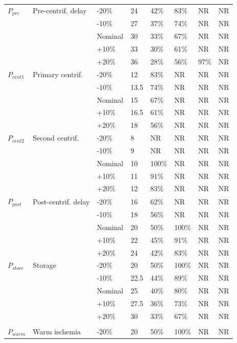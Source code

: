\documentclass[preprint,12pt]{elsarticle}
\begin{document}
\begin{longtable}{@{}C{1.55cm} L{2.8cm} C{1.35cm} R{1.05cm} C{1.05cm} C{1.05cm} C{1.05cm} C{1.05cm}@{}}
\addlinespace[0.35em] \\ \midrule
$P_{pre}$ & Pre-centrif. delay & -20\% & 24 & 42\% & 83\% & NR & NR \\
 &  & -10\% & 27 & 37\% & 74\% & NR & NR \\
 &  & Nominal & 30 & 33\% & 67\% & NR & NR \\
 &  & +10\% & 33 & 30\% & 61\% & NR & NR \\
 &  & +20\% & 36 & 28\% & 56\% & 97\% & NR \\
\addlinespace[0.18em]
$P_{cent1}$ & Primary centrif. & -20\% & 12 & 83\% & NR & NR & NR \\
 &  & -10\% & 13.5 & 74\% & NR & NR & NR \\
 &  & Nominal & 15 & 67\% & NR & NR & NR \\
 &  & +10\% & 16.5 & 61\% & NR & NR & NR \\
 &  & +20\% & 18 & 56\% & NR & NR & NR \\
\addlinespace[0.18em]
$P_{cent2}$ & Second centrif. & -20\% & 8 & NR & NR & NR & NR \\
 &  & -10\% & 9 & NR & NR & NR & NR \\
 &  & Nominal & 10 & 100\% & NR & NR & NR \\
 &  & +10\% & 11 & 91\% & NR & NR & NR \\
 &  & +20\% & 12 & 83\% & NR & NR & NR \\
\addlinespace[0.18em]
$P_{post}$ & Post-centrif. delay & -20\% & 16 & 62\% & NR & NR & NR \\
 &  & -10\% & 18 & 56\% & NR & NR & NR \\
 &  & Nominal & 20 & 50\% & 100\% & NR & NR \\
 &  & +10\% & 22 & 45\% & 91\% & NR & NR \\
 &  & +20\% & 24 & 42\% & 83\% & NR & NR \\
\addlinespace[0.18em]
$P_{store}$ & Storage & -20\% & 20 & 50\% & 100\% & NR & NR \\
 &  & -10\% & 22.5 & 44\% & 89\% & NR & NR \\
 &  & Nominal & 25 & 40\% & 80\% & NR & NR \\
 &  & +10\% & 27.5 & 36\% & 73\% & NR & NR \\
 &  & +20\% & 30 & 33\% & 67\% & NR & NR \\
\addlinespace[0.18em]
\midrule
\addlinespace[0.35em] \\ \midrule
$P_{warm}$ & Warm ischemia & -20\% & 20 & 50\% & 100\% & NR & NR \\

\end{longtable}
\end{document}
